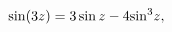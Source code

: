 \[\mathop{\sin\/}\nolimits\!\left(3z\right)=3\mathop{\sin\/}\nolimits z-4{%
\mathop{\sin\/}\nolimits^{3}}z,\]